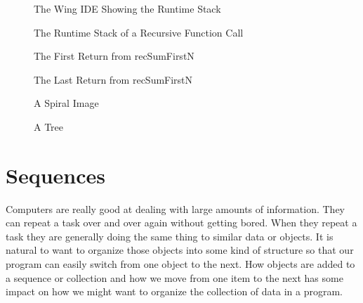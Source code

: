 \documentclass[letterpaper,10pt,english]{sphinxmanual}
\begin{document}
\begin{figure}[htbp]
\centering
\capstart

\noindent{}
\caption{The Wing IDE Showing the Run\sphinxhyphen{}time Stack}\label{\detokenize{chap3/chap3:id4}}\end{figure}

\begin{figure}[htbp]
\centering
\capstart

\noindent{}
\caption{The Run\sphinxhyphen{}time Stack of a Recursive Function Call}\label{\detokenize{chap3/chap3:id5}}\end{figure}

\begin{figure}[htbp]
\centering
\capstart

\noindent{}
\caption{The First Return from recSumFirstN}\label{\detokenize{chap3/chap3:id6}}\end{figure}

\begin{figure}[htbp]
\centering
\capstart

\noindent{}
\caption{The Last Return from recSumFirstN}\label{\detokenize{chap3/chap3:id7}}\end{figure}

\begin{figure}[htbp]
\centering
\capstart

\noindent{}
\caption{A Spiral Image}\label{\detokenize{chap3/chap3:id8}}\end{figure}

\begin{figure}[htbp]
\centering
\capstart

\noindent{}
\caption{A Tree}\label{\detokenize{chap3/chap3:id9}}\end{figure}


\chapter{Sequences}
\label{\detokenize{chap4/chap4:sequences}}\label{\detokenize{chap4/chap4:chap4}}\label{\detokenize{chap4/chap4::doc}}
Computers are really good at dealing with large amounts of information. They can repeat a task over and over again without getting bored. When they repeat a task they are generally doing the same thing to similar data or objects. It is natural to want to organize those objects into some kind of structure so that our program can easily switch from one object to the next. How objects are added to a sequence or collection and how we move from one item to the next has some impact on how we might want to organize the collection of data in a program.
\end{document}
